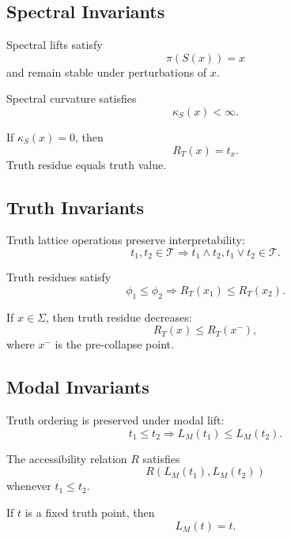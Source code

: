 \subsection{Spectral Invariants}

\begin{invariant}
Spectral lifts satisfy
\[
\pi(S(x)) = x
\]
and remain stable under perturbations of $x$.
\end{invariant}

\begin{invariant}
Spectral curvature satisfies
\[
\kappa_S(x) < \infty.
\]
\end{invariant}

\begin{invariant}
If $\kappa_S(x) = 0$, then
\[
R_T(x) = t_x.
\]
Truth residue equals truth value.
\end{invariant}


\subsection{Truth Invariants}

\begin{invariant}
Truth lattice operations preserve interpretability:
\[
t_1, t_2 \in \mathcal{T} \Rightarrow t_1 \wedge t_2, t_1 \vee t_2 \in \mathcal{T}.
\]
\end{invariant}

\begin{invariant}
Truth residues satisfy
\[
\phi_1 \le \phi_2 \Rightarrow R_T(x_1) \le R_T(x_2).
\]
\end{invariant}

\begin{invariant}
If $x \in \Sigma$, then truth residue decreases:
\[
R_T(x) \le R_T(x^-),
\]
where $x^-$ is the pre-collapse point.
\end{invariant}


\subsection{Modal Invariants}

\begin{invariant}
Truth ordering is preserved under modal lift:
\[
t_1 \le t_2 \Rightarrow L_M(t_1) \le L_M(t_2).
\]
\end{invariant}

\begin{invariant}
The accessibility relation $R$ satisfies
\[
R(L_M(t_1), L_M(t_2))
\]
whenever $t_1 \le t_2$.
\end{invariant}

\begin{invariant}
If $t$ is a fixed truth point, then
\[
L_M(t) = t.
\]
\end{invariant}
